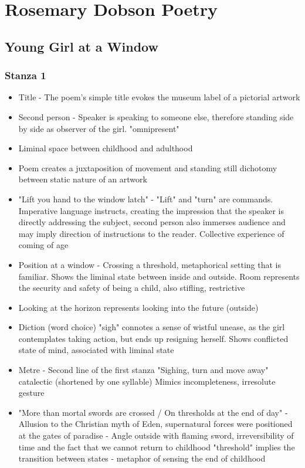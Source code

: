 
\chapter{Rosemary Dobson Poetry}

\section{Young Girl at a Window} \label{1/11/2024}
	\subsection{Stanza 1}
		\begin{itemize}
			\item Title - The poem's simple title evokes the museum label of a pictorial artwork
			\item Second person - Speaker is speaking to someone else, therefore standing side by side as observer of the girl. "omnipresent"
			\item Liminal space between childhood and adulthood
			\item Poem creates a juxtaposition of movement and standing still
				\subitem dichotomy between static nature of an artwork
			\item "Lift you hand to the window latch" - "Lift" and "turn" are commands. Imperative language instructs, creating the impression that the speaker is directly addressing the subject, second person also immerses audience and may imply direction of instructions to the reader. Collective experience of coming of age
			\item Position at a window - Crossing a threshold, metaphorical setting that is familiar. Shows the liminal state between inside and outside. Room represents the security and safety of being a child, also stifling, restrictive
			\item Looking at the horizon represents looking into the future (outside)
			\item Diction (word choice) "sigh" connotes a sense of wistful unease, as the girl contemplates taking action, but ends up resigning herself. Shows conflicted state of mind, associated with liminal state
			\item Metre - Second line of the first stanza "Sighing, turn and move away" catalectic (shortened by one syllable) Mimics incompleteness, irresolute gesture
			\item "More than mortal swords are crossed / On thresholds at the end of day" - Allusion to the Christian myth of Eden, supernatural forces were positioned at the gates of paradise - Angle outside with flaming sword, irreversibility of time and the fact that we cannot return to childhood "threshold" implies the transition between states - metaphor of sensing the end of childhood

\end{itemize}
